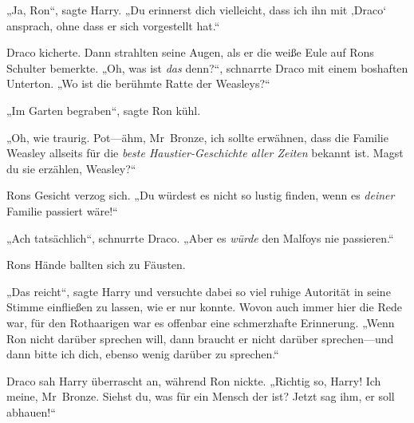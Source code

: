 „Ja, Ron“, sagte Harry. „Du erinnerst dich vielleicht, dass ich ihn mit ‚Draco‘ ansprach, ohne dass er sich vorgestellt hat.“

Draco kicherte. Dann strahlten seine Augen, als er die weiße Eule auf Rons Schulter bemerkte. „Oh, was ist \emph{das} denn?“, schnarrte Draco mit einem boshaften Unterton. „Wo ist die berühmte Ratte der Weasleys?“

„Im Garten begraben“, sagte Ron kühl.

„Oh, wie traurig. Pot—ähm, Mr~Bronze, ich sollte erwähnen, dass die Familie Weasley allseits für die \emph{beste Haustier-Geschichte aller Zeiten} bekannt ist. Magst du sie erzählen, Weasley?“

Rons Gesicht verzog sich. „Du würdest es nicht so lustig finden, wenn es \emph{deiner} Familie passiert wäre!“

„Ach tatsächlich“, schnurrte Draco. „Aber es \emph{würde} den Malfoys nie passieren.“

Rons Hände ballten sich zu Fäusten.

„Das reicht“, sagte Harry und versuchte dabei so viel ruhige Autorität in seine Stimme einfließen zu lassen, wie er nur konnte. Wovon auch immer hier die Rede war, für den Rothaarigen war es offenbar eine schmerzhafte Erinnerung. „Wenn Ron nicht darüber sprechen will, dann braucht er nicht darüber sprechen—und dann bitte ich dich, ebenso wenig darüber zu sprechen.“

Draco sah Harry überrascht an, während Ron nickte. „Richtig so, Harry! Ich meine, Mr~Bronze. Siehst du, was für ein Mensch der ist? Jetzt sag ihm, er soll abhauen!“

